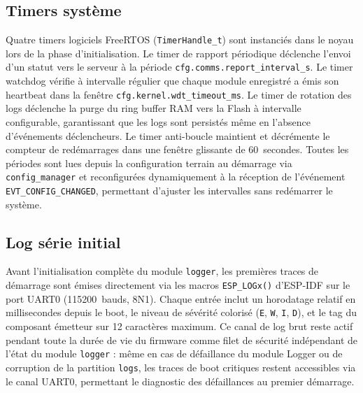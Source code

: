 \subsection{Timers système}
\label{subsec:timers_impl}

Quatre timers logiciels FreeRTOS (\texttt{TimerHandle\_t}) sont
instanciés dans le noyau lors de la phase d'initialisation. Le timer
de rapport périodique déclenche l'envoi d'un statut vers le serveur
à la période \texttt{cfg.comms.report\_interval\_s}. Le timer
watchdog vérifie à intervalle régulier que chaque module enregistré
a émis son heartbeat dans la fenêtre \texttt{cfg.kernel.wdt\_timeout\_ms}.
Le timer de rotation des logs déclenche la purge du ring buffer RAM
vers la Flash à intervalle configurable, garantissant que les logs
sont persistés même en l'absence d'événements déclencheurs. Le timer
anti-boucle maintient et décrémente le compteur de redémarrages dans
une fenêtre glissante de 60~secondes. Toutes les périodes sont lues
depuis la configuration terrain au démarrage via \texttt{config\_manager}
et reconfigurées dynamiquement à la réception de l'événement
\texttt{EVT\_CONFIG\_CHANGED}, permettant d'ajuster les intervalles
sans redémarrer le système.

\subsection{Log série initial}
\label{subsec:logserial}

Avant l'initialisation complète du module \texttt{logger}, les
premières traces de démarrage sont émises directement via les macros
\texttt{ESP\_LOGx()} d'ESP-IDF sur le port UART0 (115200~bauds,
8N1). Chaque entrée inclut un horodatage relatif en millisecondes
depuis le boot, le niveau de sévérité colorisé (\texttt{E}, \texttt{W},
\texttt{I}, \texttt{D}), et le tag du composant émetteur sur 12
caractères maximum. Ce canal de log brut reste actif pendant toute
la durée de vie du firmware comme filet de sécurité indépendant de
l'état du module \texttt{logger} : même en cas de défaillance du
module Logger ou de corruption de la partition \texttt{logs}, les
traces de boot critiques restent accessibles via le canal UART0,
permettant le diagnostic des défaillances au premier démarrage.

